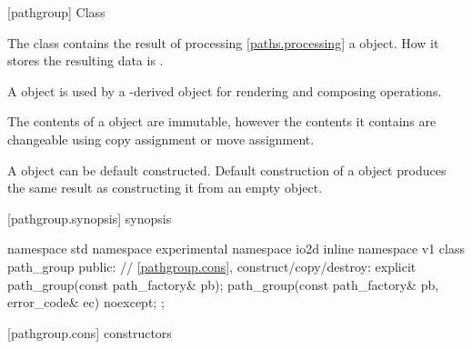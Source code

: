  [pathgroup] {Class }

\pnum
{}
The class  contains the result of processing \ref{paths.processing} a  object. How it stores the resulting data is \unspec.

\pnum
A  object is used by a -derived object for rendering and composing operations.

\pnum
The contents of a  object are immutable, however the contents it contains are changeable using copy assignment or move assignment.

\pnum
A  object can be default constructed. Default construction of a  object produces the same result as constructing it from an empty  object.
%

%
 [pathgroup.synopsis] { synopsis}

\begin{codeblock}
namespace std { namespace experimental { namespace io2d { inline namespace v1 {
  class path_group {
    public:
    // \ref{pathgroup.cons}, construct/copy/destroy:
    explicit path_group(const path_factory& pb);
    path_group(const path_factory& pb, error_code& ec) noexcept;
  };
} } } }
\end{codeblock}

 [pathgroup.cons] { constructors}

